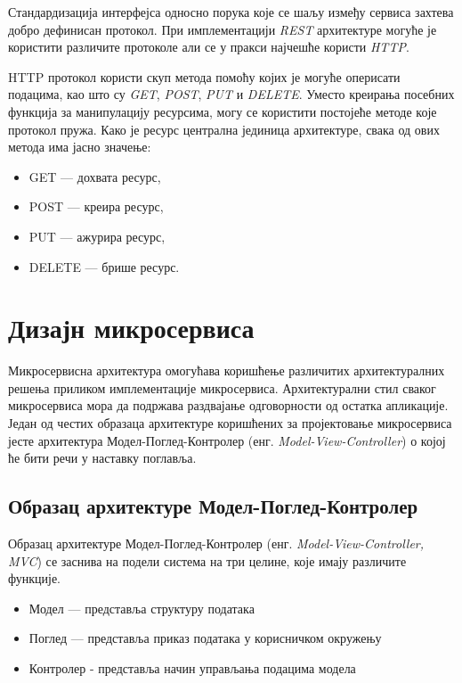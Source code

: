\documentclass[12pt,oneside]{memoir}
\begin{document}
Стандардизација интерфејса односно порука које се шаљу између сервиса захтева добро дефинисан протокол. При имплементацији \textit{REST} архитектуре могуће је користити различите протоколе али се у пракси најчешће користи \textit{HTTP}.

HTTP протокол користи скуп метода помоћу којих је могуће оперисати подацима, као што су \textit{GET}, \textit{POST}, \textit{PUT} и \textit{DELETE}.  Уместо креирања посебних функција за манипулацију ресурсима, могу се користити постојеће методе које протокол пружа. Како је ресурс централна јединица архитектуре, свака од ових метода има јасно значење: 
\begin{itemize}
\item GET --- дохвата ресурс,
\item POST --- креира ресурс,
\item PUT --- ажурира ресурс,
\item DELETE --- брише ресурс.
\end{itemize}


\section{Дизајн микросервиса}

Микросервисна архитектура омогућава коришћење различитих архитектуралних решења приликом имплементације микросервиса. Архитектурални стил сваког микросервиса мора да подржава раздвајање одговорности од остатка апликације. Један од честих образаца архитектуре коришћених за пројектовање микросервиса јесте архитектура Модел-Поглед-Контролер (енг.\textit{ Model-View-Controller}) о којој ће бити речи у наставку поглавља.

\subsection{Образац архитектуре Модел-Поглед-Контролер}

Образац архитектуре Модел-Поглед-Контролер (енг. \textit{Model-View-Controller, MVC}) се заснива на подели система на три целине, које имају различите функције.
\begin{itemize}
\item Модел — представља структуру података
\item Поглед — представља приказ података у корисничком окружењу
\item Контролер -  представља начин управљања подацима модела
\end{itemize}
\end{document}
